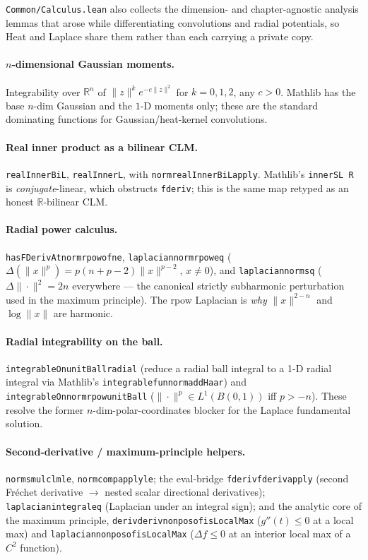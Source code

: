 ﻿\documentclass[12pt, a4paper]{article}
\renewcommand{\_}{\origunderscore\allowbreak}
\theoremstyle{definition}
\theoremstyle{plain}
\begin{document}
\texttt{Common/\allowbreak Calculus.\allowbreak lean} also collects the dimension- and chapter-agnostic analysis lemmas that
arose while differentiating convolutions and radial potentials, so Heat and Laplace share them
rather than each carrying a private copy.

\paragraph{$n$-dimensional Gaussian moments.}
Integrability over $\mathbb{R}^n$ of $\|z\|^k e^{-c\|z\|^2}$ for $k=0,1,2$, any $c>0$. Mathlib
has the base $n$-dim Gaussian and the $1$-D moments only; these are the standard dominating
functions for Gaussian/heat-kernel convolutions.

\paragraph{Real inner product as a bilinear CLM.}
\texttt{realInnerBiL}, \texttt{realInnerL}, with \texttt{norm\_realInnerBiL\_apply}. Mathlib's
\texttt{innerSL R} is \emph{conjugate}-linear, which obstructs \texttt{fderiv}; this is the
same map retyped as an honest $\mathbb{R}$-bilinear CLM.

\paragraph{Radial power calculus.}
\texttt{hasFDerivAt\_norm\_rpow\_of\_ne}, \texttt{laplacian\_norm\_rpow\_eq}
($\Delta(\|x\|^p) = p(n+p-2)\|x\|^{p-2}$, $x\neq 0$), and \texttt{laplacian\_norm\_sq}
($\Delta\|\cdot\|^2 = 2n$ everywhere --- the canonical strictly subharmonic perturbation used
in the maximum principle). The rpow Laplacian is \emph{why} $\|x\|^{2-n}$ and $\log\|x\|$ are
harmonic.

\paragraph{Radial integrability on the ball.}
\texttt{integrableOn\_unitBall\_radial} (reduce a radial ball integral to a 1-D radial integral
via Mathlib's \texttt{integrable\_fun\_norm\_addHaar}) and \texttt{integrableOn\_norm\_rpow\_unitBall}
($\|\cdot\|^p\in L^1(B(0,1))$ iff $p>-n$). These resolve the former $n$-dim-polar-coordinates
blocker for the Laplace fundamental solution.

\paragraph{Second-derivative / maximum-principle helpers.}
\texttt{norm\_smul\_clm\_le}, \texttt{norm\_comp\_apply\_le}; the eval-bridge
\texttt{fderiv\_fderiv\_apply} (second Fréchet derivative $\to$ nested scalar directional
derivatives); \texttt{laplacian\_integral\_eq} (Laplacian under an integral sign); and the
analytic core of the maximum principle, \texttt{deriv\_deriv\_nonpos\_of\_isLocalMax}
($g''(t)\le 0$ at a local max) and \texttt{laplacian\_nonpos\_of\_isLocalMax} ($\Delta f\le 0$
at an interior local max of a $C^2$ function).
\end{document}
